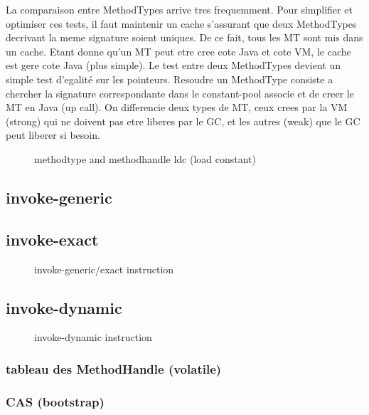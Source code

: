 \documentclass{sigplanconf}
\begin{document}
  La comparaison entre MethodTypes arrive tres frequemment.
  Pour simplifier et optimiser ces tests, il faut maintenir un cache s'assurant que deux MethodTypes decrivant la meme signature soient uniques.
  De ce fait, tous les MT sont mis dans un cache.
  Etant donne qu'un MT peut etre cree cote Java et cote VM, le cache est gere cote Java (plus simple).
  Le test entre deux MethodTypes devient un simple test d'egalité sur les pointeurs.
  Resoudre un MethodType consiste a chercher la signature correspondante dans le constant-pool associe et de creer le MT en Java (up call).
  On differencie deux types de MT, ceux crees par la VM (strong) qui ne doivent pas etre liberes par le GC, et les autres (weak) que le GC peut liberer si besoin.

  \begin{figure}[!h]
    \centering 
    \caption{methodtype and methodhandle ldc (load constant)}
    \label{MTMHldc}
  \end{figure}

  \subsection{invoke-generic}
  \subsection{invoke-exact}

    \begin{figure}[!h]
      \centering 
      \caption{invoke-generic/exact instruction}
      \label{INGEins}
    \end{figure}

  \subsection{invoke-dynamic}

    \begin{figure}[!h]
      \centering 
      \caption{invoke-dynamic instruction}
      \label{INDYins}
    \end{figure}

    \subsubsection{tableau des MethodHandle (volatile)}
    \subsubsection{CAS (bootstrap)}
\end{document}
